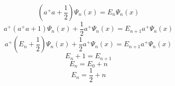 \documentclass[1 pt]{article}
\begin{document}
\begin{equation*}
    (a^+a+\frac{1}{2}) \Psi_{n}(x) = E_{n} \Psi_{n} (x)
\end{equation*}
\begin{equation*}
    a^+ (a^+ a + 1) \Psi_n (x)+\frac{1}{2} a^+ \Psi_n (x) = E_{n+1} a^+ \Psi_n (x)
\end{equation*}
\begin{equation*}
    a^+ (E_n + \frac{1}{2}) \Psi_n (x)+\frac{1}{2} a^+ \Psi_n (x) = E_{n+1} a^+ \Psi_n (x)
\end{equation*}
\begin{equation*}
    E_n + 1 = E_{n+1}
\end{equation*}
\begin{equation*}
    E_n = E_0 + n
\end{equation*}
\begin{equation}
    E_n = \frac{1}{2} + n
\end{equation}
\end{document}
